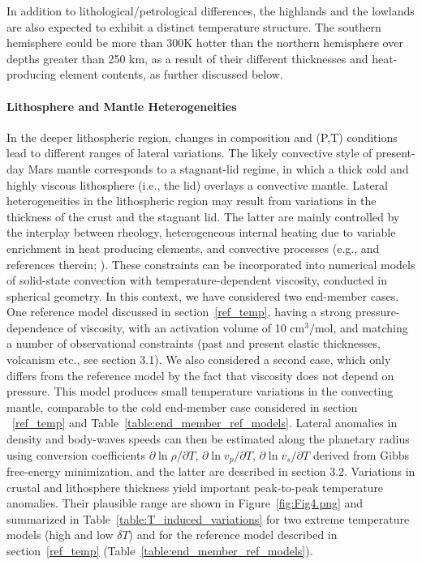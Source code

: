 In addition to lithological/petrological differences, the highlands and the lowlands are also expected 
to exhibit a distinct temperature structure. The southern hemisphere could be more than 300K hotter than the northern hemisphere over depths greater than 250 km, as a result of their different thicknesses and heat-producing element contents, as further discussed below.


\paragraph{Lithosphere and Mantle Heterogeneities}
In the deeper lithospheric region, changes in composition and (P,T) conditions lead to different ranges of lateral variations. The likely convective style of present-day Mars mantle corresponds to a stagnant-lid regime, in which a thick cold and highly viscous lithosphere (i.e., the lid) overlays a convective mantle. Lateral heterogeneities in the lithospheric region may result from variations in the thickness of the crust and the stagnant lid. The latter are mainly controlled by the interplay between rheology, heterogeneous internal heating due to variable enrichment in heat producing elements, and convective processes (e.g., \citep{Plesa2016} and references therein; \citep{Thiriet2018}). These constraints can be incorporated into numerical models of solid-state convection with temperature-dependent viscosity, conducted in spherical geometry. In this context, we have considered two end-member cases. 
One reference model discussed in section~\ref{ref_temp}, having a strong pressure-dependence of viscosity, with an activation volume of 10 cm$^3$/mol, and matching a number of observational constraints (past and present elastic thicknesses, volcanism etc., see section 3.1). 
We also considered a second case, which only differs from the reference model by the fact that  viscosity does not depend on pressure. This model produces small temperature variations in the convecting mantle, comparable to the cold end-member case considered in section ~\ref{ref_temp} and Table~\ref{table:end_member_ref_models}.
Lateral anomalies in density and body-waves speeds can then be estimated along the planetary radius using conversion coefficients $\partial \ln\rho/\partial T$, $\partial \ln v_p/\partial T$, $\partial \ln  v_s/\partial T$ derived from Gibbs free-energy minimization, and the latter are described in section 3.2. Variations in crustal and lithosphere thickness yield important peak-to-peak temperature anomalies. Their plausible range are shown in Figure~\ref{fig:Fig4.png} and summarized in Table~\ref{table:T_induced_variations} for two extreme temperature models (high and  low $\delta T$) and for the reference model described in section~\ref{ref_temp} (Table~\ref{table:end_member_ref_models}). 

